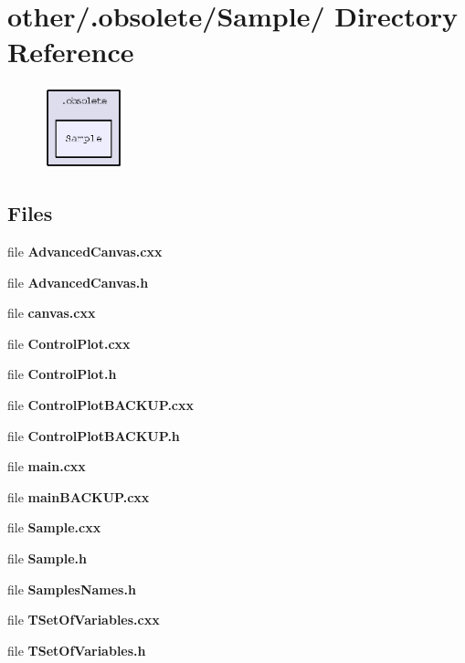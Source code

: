 \section{other/.obsolete/Sample/ Directory Reference}
\label{dir_686daa277d6d5bfc92be2e174f2808b2}


\begin{figure}[H]
\begin{center}
\leavevmode
\includegraphics[width=65pt]{dir_686daa277d6d5bfc92be2e174f2808b2_dep}
\end{center}
\end{figure}
\subsection*{Files}
\begin{CompactItemize}
\item 
file \textbf{Advanced\-Canvas.cxx}
\item 
file \textbf{Advanced\-Canvas.h}
\item 
file \textbf{canvas.cxx}
\item 
file \textbf{Control\-Plot.cxx}
\item 
file \textbf{Control\-Plot.h}
\item 
file \textbf{Control\-Plot\-BACKUP.cxx}
\item 
file \textbf{Control\-Plot\-BACKUP.h}
\item 
file \textbf{main.cxx}
\item 
file \textbf{main\-BACKUP.cxx}
\item 
file \textbf{Sample.cxx}
\item 
file \textbf{Sample.h}
\item 
file \textbf{Samples\-Names.h}
\item 
file \textbf{TSet\-Of\-Variables.cxx}
\item 
file \textbf{TSet\-Of\-Variables.h}
\end{CompactItemize}
